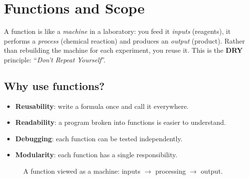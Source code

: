\chapter{Functions and Scope}
\label{ch:fonctions}

\begin{intuition}
A function is like a \emph{machine} in a laboratory: you feed it
\emph{inputs} (reagents), it performs a \emph{process} (chemical reaction) and
produces an \emph{output} (product). Rather than rebuilding the machine for each
experiment, you reuse it. This is the \textbf{DRY} principle:
``\emph{Don't Repeat Yourself}''.
\end{intuition}

\section{Why use functions?}

\begin{itemize}
    \item \textbf{Reusability}: write a formula once and call it everywhere.
    \item \textbf{Readability}: a program broken into functions is easier to understand.
    \item \textbf{Debugging}: each function can be tested independently.
    \item \textbf{Modularity}: each function has a single responsibility.
\end{itemize}

\begin{figure}[ht]
\centering
{}
\caption{A function viewed as a machine: inputs $\to$ processing $\to$ output.}
\label{fig:fonction-machine}
\end{figure}

